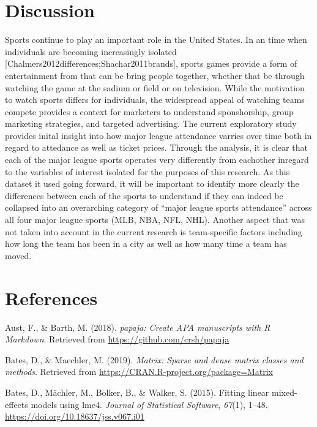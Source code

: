 \documentclass[man, fleqn, noextraspace,floatsintext]{apa6}
\begin{document}
\section{Discussion}\label{discussion}

Sports continue to play an important role in the United States. In an
time when individuals are becoming increasingly isolated
{[}Chalmers2012differences;Shachar2011brands{]}, sports games provide a
form of entertainment from that can be bring people together, whether
that be through watching the game at the sadium or field or on
television. While the motivation to watch sports differs for
individuals, the widespread appeal of watching teams compete provides a
context for marketers to understand sponshorship, group marketing
strategies, and targeted advertising. The current exploratory study
provides inital insight into how major league attendance varries over
time both in regard to attedance as well as ticket prices. Through the
analysis, it is clear that each of the major league sports operates very
differently from eachother inregard to the variables of interest
isolated for the purposes of this research. As this dataset it used
going forward, it will be important to identify more clearly the
differences between each of the sports to understand if they can indeed
be collapsed into an overarching category of \enquote{major league
sports attendance} across all four major league sports (MLB, NBA, NFL,
NHL). Another aspect that was not taken into account in the current
research is team-specific factors including how long the team has been
in a city as well as how many time a team has moved.

\newpage

\section{References}\label{references}

\begingroup
\setlength{\parindent}{-0.5in} \setlength{\leftskip}{0.5in}

\hypertarget{refs}{}
\hypertarget{ref-R-papaja}{}
Aust, F., \& Barth, M. (2018). \emph{papaja: Create APA manuscripts with
R Markdown}. Retrieved from \url{https://github.com/crsh/papaja}

\hypertarget{ref-R-Matrix}{}
Bates, D., \& Maechler, M. (2019). \emph{Matrix: Sparse and dense matrix
classes and methods}. Retrieved from
\url{https://CRAN.R-project.org/package=Matrix}

\hypertarget{ref-R-lme4}{}
Bates, D., Mächler, M., Bolker, B., \& Walker, S. (2015). Fitting linear
mixed-effects models using lme4. \emph{Journal of Statistical Software},
\emph{67}(1), 1--48. \url{https://doi.org/10.18637/jss.v067.i01}
\end{document}
